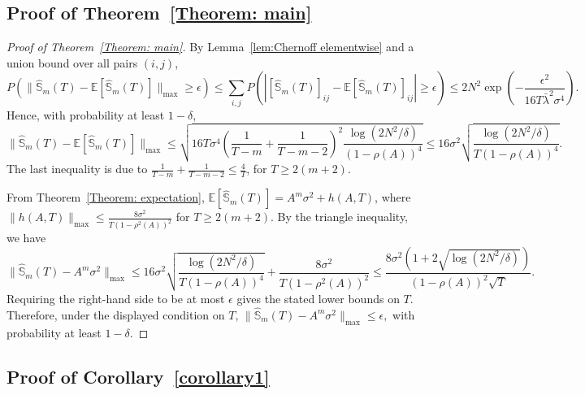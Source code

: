 \documentclass[11pt]{article}
\begin{document}
\subsection{Proof of Theorem~\ref{Theorem: main}}
\begin{proof}[Proof of Theorem~\ref{Theorem: main}]
By Lemma~\ref{lem:Chernoff elementwise} and a union bound over all pairs $(i,j)$,
\[
P\!\left(\|\hat{\mathbb{S}}_m(T)-\mathbb{E}[\hat{\mathbb{S}}_m(T)]\|_{\max}\ge\epsilon\right)
\le
\sum_{i,j} P\!\left(|[\hat{\mathbb{S}}_m(T)]_{ij}-\mathbb{E}[\hat{\mathbb{S}}_m(T)]_{ij}|\ge\epsilon\right)
\le
2N^2\exp\!\left(-\frac{\epsilon^2}{16T\bar{\lambda}^2\sigma^4}\right).
\]
Hence, with probability at least $1-\delta$,
\[
\|\hat{\mathbb{S}}_m(T)-\mathbb{E}[\hat{\mathbb{S}}_m(T)]\|_{\max}
\le
\sqrt{
16T\sigma^4
\!\left(\frac{1}{T-m}+\frac{1}{T-m-2}\right)^{\!2}
\frac{\log(2N^2/\delta)}{(1-\rho(A))^4}
}
\le
16\sigma^2\sqrt{\frac{\log(2N^2/\delta)}{T(1-\rho(A))^4}}.
\]
The last inequality is due to 
$\frac{1}{T-m}+\frac{1}{T-m-2}\le\frac{4}{T}$, for $T\ge2(m+2)$.

From Theorem~\ref{Theorem: expectation},
$\mathbb{E}[\hat{\mathbb{S}}_m(T)]=A^m\sigma^2+h(A,T)$,
where $\|h(A,T)\|_{\max}\le\frac{8\sigma^2}{T(1-\rho^2(A))^2}$ for $T\ge2(m+2)$.
By the triangle inequality, we have
\[
\|\hat{\mathbb{S}}_m(T)-A^m\sigma^2\|_{\max}
\le
16\sigma^2\sqrt{\frac{\log(2N^2/\delta)}{T(1-\rho(A))^4}}
+\frac{8\sigma^2}{T(1-\rho^2(A))^2} \le \frac{8\sigma^2(1+2\sqrt{\log(2N^2/\delta)})}{(1-\rho(A))^2\sqrt{T}}.
\]
Requiring the right-hand side to be at most $\epsilon$
gives the stated lower bounds on $T$.
Therefore, under the displayed condition on $T$, $\|\hat{\mathbb{S}}_m(T)-A^m\sigma^2\|_{\max}\le\epsilon,
$ with probability at least $1-\delta$.
\qedhere
\end{proof}


\subsection{Proof of Corollary~\ref{corollary1}}
\end{document}
